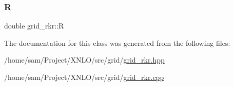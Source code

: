 \mbox{\label{classgrid__rkr_a2da8ae00c520a66c9cac2784a2149dcb}} 
\subsubsection{\texorpdfstring{R}{R}}
{\footnotesize\ttfamily double grid\+\_\+rkr\+::R}



The documentation for this class was generated from the following files\+:\begin{DoxyCompactItemize}
\item 
/home/sam/\+Project/\+X\+N\+L\+O/src/grid/\mbox{\hyperlink{grid__rkr_8hpp}{grid\+\_\+rkr.\+hpp}}\item 
/home/sam/\+Project/\+X\+N\+L\+O/src/grid/\mbox{\hyperlink{grid__rkr_8cpp}{grid\+\_\+rkr.\+cpp}}\end{DoxyCompactItemize}
